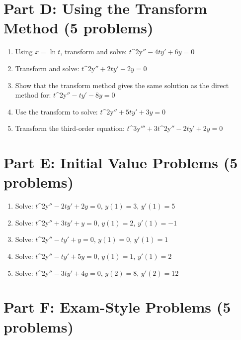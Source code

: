 \documentclass[12pt]{article}
\begin{document}
\section*{Part D: Using the Transform Method (5 problems)}

\begin{enumerate}[resume]
\item Using $x = \ln t$, transform and solve: $t$^{2y}$'' - 4ty' + 6y = 0$

\item Transform and solve: $t$^{2y}$'' + 2ty' - 2y = 0$

\item Show that the transform method gives the same solution as the direct method for: $t$^{2y}$'' - ty' - 8y = 0$

\item Use the transform to solve: $t$^{2y}$'' + 5ty' + 3y = 0$

\item Transform the third-order equation: $t$^{3y}$''' + 3t$^{2y}$'' - 2ty' + 2y = 0$
\end{enumerate}

\section*{Part E: Initial Value Problems (5 problems)}

\begin{enumerate}[resume]
\item Solve: $t$^{2y}$'' - 2ty' + 2y = 0$, $y(1) = 3$, $y'(1) = 5$

\item Solve: $t$^{2y}$'' + 3ty' + y = 0$, $y(1) = 2$, $y'(1) = -1$

\item Solve: $t$^{2y}$'' - ty' + y = 0$, $y(1) = 0$, $y'(1) = 1$

\item Solve: $t$^{2y}$'' - ty' + 5y = 0$, $y(1) = 1$, $y'(1) = 2$

\item Solve: $t$^{2y}$'' - 3ty' + 4y = 0$, $y(2) = 8$, $y'(2) = 12$
\end{enumerate}

\section*{Part F: Exam-Style Problems (5 problems)}
\end{document}
